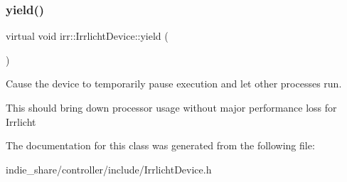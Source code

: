 \subsubsection{\texorpdfstring{yield()}{yield()}\hspace{0.1cm}{\footnotesize\ttfamily [2/2]}}
{\footnotesize\ttfamily virtual void irr\+::\+Irrlicht\+Device\+::yield (\begin{DoxyParamCaption}{ }\end{DoxyParamCaption})\hspace{0.3cm}{\ttfamily [pure virtual]}}



Cause the device to temporarily pause execution and let other processes run. 

This should bring down processor usage without major performance loss for Irrlicht 

The documentation for this class was generated from the following file\+:\begin{DoxyCompactItemize}
\item 
indie\+\_\+share/controller/include/Irrlicht\+Device.\+h\end{DoxyCompactItemize}
